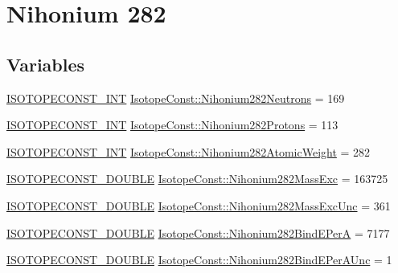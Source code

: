\hypertarget{group___isotope_const-_nihonium-_nh282}{}\section{Nihonium 282}
\label{group___isotope_const-_nihonium-_nh282}
\subsection*{Variables}
\begin{DoxyCompactItemize}
\item 
\mbox{\hyperlink{group___isotope_const-_macros_ga5f18360b3e99483a35c32d789e62621c}{I\+S\+O\+T\+O\+P\+E\+C\+O\+N\+S\+T\+\_\+\+I\+NT}} \mbox{\hyperlink{group___isotope_const-_nihonium-_nh282_ga86283920e4033f0f68de992a5e7068fd}{Isotope\+Const\+::\+Nihonium282\+Neutrons}} = 169
\item 
\mbox{\hyperlink{group___isotope_const-_macros_ga5f18360b3e99483a35c32d789e62621c}{I\+S\+O\+T\+O\+P\+E\+C\+O\+N\+S\+T\+\_\+\+I\+NT}} \mbox{\hyperlink{group___isotope_const-_nihonium-_nh282_ga09bfeca39c484d45c4d5fe451294c95a}{Isotope\+Const\+::\+Nihonium282\+Protons}} = 113
\item 
\mbox{\hyperlink{group___isotope_const-_macros_ga5f18360b3e99483a35c32d789e62621c}{I\+S\+O\+T\+O\+P\+E\+C\+O\+N\+S\+T\+\_\+\+I\+NT}} \mbox{\hyperlink{group___isotope_const-_nihonium-_nh282_gaac89422de27454feda4840fe130d560c}{Isotope\+Const\+::\+Nihonium282\+Atomic\+Weight}} = 282
\item 
\mbox{\hyperlink{group___isotope_const-_macros_ga8f45a7272ce02c0b4c65c44636ed719a}{I\+S\+O\+T\+O\+P\+E\+C\+O\+N\+S\+T\+\_\+\+D\+O\+U\+B\+LE}} \mbox{\hyperlink{group___isotope_const-_nihonium-_nh282_ga1e329741aa033ad7d05f520b7c7c1b29}{Isotope\+Const\+::\+Nihonium282\+Mass\+Exc}} = 163725
\item 
\mbox{\hyperlink{group___isotope_const-_macros_ga8f45a7272ce02c0b4c65c44636ed719a}{I\+S\+O\+T\+O\+P\+E\+C\+O\+N\+S\+T\+\_\+\+D\+O\+U\+B\+LE}} \mbox{\hyperlink{group___isotope_const-_nihonium-_nh282_gaf30ca19c6784c9afaf812bd746b2ee7b}{Isotope\+Const\+::\+Nihonium282\+Mass\+Exc\+Unc}} = 361
\item 
\mbox{\hyperlink{group___isotope_const-_macros_ga8f45a7272ce02c0b4c65c44636ed719a}{I\+S\+O\+T\+O\+P\+E\+C\+O\+N\+S\+T\+\_\+\+D\+O\+U\+B\+LE}} \mbox{\hyperlink{group___isotope_const-_nihonium-_nh282_ga0f8afab0bd4e46c1a65f723a81c63d7d}{Isotope\+Const\+::\+Nihonium282\+Bind\+E\+PerA}} = 7177
\item 
\mbox{\hyperlink{group___isotope_const-_macros_ga8f45a7272ce02c0b4c65c44636ed719a}{I\+S\+O\+T\+O\+P\+E\+C\+O\+N\+S\+T\+\_\+\+D\+O\+U\+B\+LE}} \mbox{\hyperlink{group___isotope_const-_nihonium-_nh282_ga002b725a88740f5b4418b93aab1e0283}{Isotope\+Const\+::\+Nihonium282\+Bind\+E\+Per\+A\+Unc}} = 1

\end{DoxyCompactItemize}

